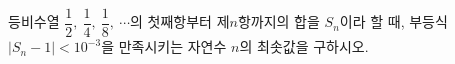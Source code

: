 등비수열 $\dfrac{1}{2},\ \dfrac{1}{4},\ \dfrac{1}{8},\ \cdots$의 첫째항부터 제$n$항까지의 합을 $S_n$이라 할 때, 부등식 $|S_n-1|<10^{-3}$을 만족시키는 자연수 $n$의 최솟값을 구하시오.
